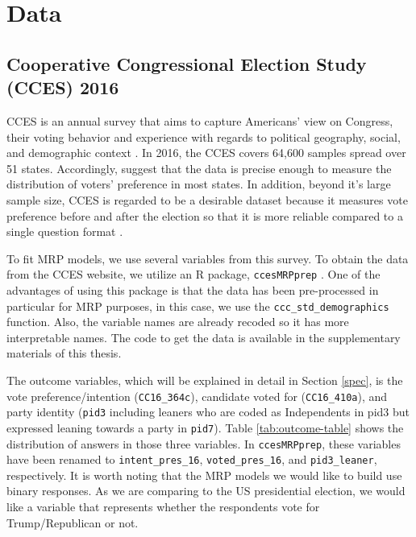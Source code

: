 \documentclass{monashthesis}
\begin{document}
\hypertarget{data}{%
\section{Data}\label{data}}

\hypertarget{cooperative-congressional-election-study-cces-2016}{%
\subsection{Cooperative Congressional Election Study (CCES) 2016}\label{cooperative-congressional-election-study-cces-2016}}

CCES is an annual survey that aims to capture Americans' view on Congress, their voting behavior and experience with regards to political geography, social, and demographic context \autocite{cces_data}. In 2016, the CCES covers 64,600 samples spread over 51 states. Accordingly, \textcite{cces_data} suggest that the data is precise enough to measure the distribution of voters' preference in most states. In addition, beyond it's large sample size, CCES is regarded to be a desirable dataset because it measures vote preference before and after the election so that it is more reliable compared to a single question format \autocite{kuriwaki}.

To fit MRP models, we use several variables from this survey. To obtain the data from the CCES website, we utilize an R package, \texttt{ccesMRPprep} \autocite{ccesmrpprep}. One of the advantages of using this package is that the data has been pre-processed in particular for MRP purposes, in this case, we use the \texttt{ccc\_std\_demographics} function. Also, the variable names are already recoded so it has more interpretable names. The code to get the data is available in the supplementary materials of this thesis.

The outcome variables, which will be explained in detail in Section \ref{spec}, is the vote preference/intention (\texttt{CC16\_364c}), candidate voted for (\texttt{CC16\_410a}), and party identity (\texttt{pid3} including leaners who are coded as Independents in pid3 but expressed leaning towards a party in \texttt{pid7}). Table \ref{tab:outcome-table} shows the distribution of answers in those three variables. In \texttt{ccesMRPprep}, these variables have been renamed to \texttt{intent\_pres\_16}, \texttt{voted\_pres\_16}, and \texttt{pid3\_leaner}, respectively. It is worth noting that the MRP models we would like to build use binary responses. As we are comparing to the US presidential election, we would like a variable that represents whether the respondents vote for Trump/Republican or not.
\end{document}
